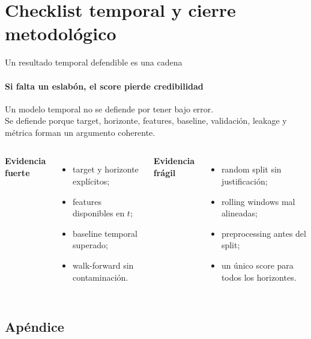 \documentclass[aspectratio=169,11pt]{beamer}  %
\begin{document}
\section{Checklist temporal y cierre metodológico}


\begin{frame}{Un resultado temporal defendible es una cadena}
\framesubtitle{Si falta un eslabón, el score pierde credibilidad}
\begin{center}\large Un modelo temporal no se defiende por tener bajo error.\\[0.3em]
Se defiende porque target, horizonte, features, baseline, validación, leakage y métrica forman un argumento coherente.\end{center}
\begin{columns}[T]
\textbf{Evidencia fuerte}
\begin{itemize}
\item target y horizonte explícitos;
\item features disponibles en $t$;
\item baseline temporal superado;
\item walk-forward sin contaminación.
\end{itemize}
\textbf{Evidencia frágil}
\begin{itemize}
\item random split sin justificación;
\item rolling windows mal alineadas;
\item preprocessing antes del split;
\item un único score para todos los horizontes.
\end{itemize}
\end{columns}
\end{frame}

\subsection{Apéndice}
\end{document}
